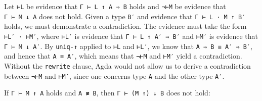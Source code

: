 Let \texttt{⊢L} be evidence that \texttt{Γ\ ⊢\ L\ ↑\ A\ ⇒\ B} holds and
\texttt{¬⊢M} be evidence that \texttt{Γ\ ⊢\ M\ ↓\ A} does not hold.
Given a type \texttt{B′} and evidence that \texttt{Γ\ ⊢\ L\ ·\ M\ ↑\ B′}
holds, we must demonstrate a contradiction. The evidence must take the
form \texttt{⊢L′\ ·\ ⊢M′}, where \texttt{⊢L′} is evidence that
\texttt{Γ\ ⊢\ L\ ↑\ A′\ ⇒\ B′} and \texttt{⊢M′} is evidence that
\texttt{Γ\ ⊢\ M\ ↓\ A′}. By \texttt{uniq-↑} applied to \texttt{⊢L} and
\texttt{⊢L′}, we know that \texttt{A\ ⇒\ B\ ≡\ A′\ ⇒\ B′}, and hence
that \texttt{A\ ≡\ A′}, which means that \texttt{¬⊢M} and \texttt{⊢M′}
yield a contradiction. Without the \texttt{rewrite} clause, Agda would
not allow us to derive a contradiction between \texttt{¬⊢M} and
\texttt{⊢M′}, since one concerns type \texttt{A} and the other type
\texttt{A′}.

If \texttt{Γ\ ⊢\ M\ ↑\ A} holds and \texttt{A\ ≢\ B}, then
\texttt{Γ\ ⊢\ (M\ ↑)\ ↓\ B} does not hold:

\begin{fence}
\begin{code}%
\>[0]\AgdaSpace{}%
\AgdaSymbol{:}\AgdaSpace{}%
\AgdaSpace{}%
\AgdaSymbol{\{}\AgdaSpace{}%
\AgdaSpace{}%
\AgdaSpace{}%
\AgdaSymbol{\}}\<%
\\
\>[0][@{}l@{\AgdaIndent{0}}]%
\>[2]\AgdaSpace{}%
\AgdaSpace{}%
\AgdaSpace{}%
\AgdaSpace{}%
\AgdaSpace{}%
\<%
\\
%
\>[2]%
\>[895I]\AgdaSpace{}%
\AgdaSpace{}%
\<%
\\
\>[.][@{}l@{}]\<[895I]%
\>[4]\AgdaComment{---------------}\<%
\\
%
\>[2]\AgdaSpace{}%
\AgdaSpace{}%
\AgdaSpace{}%
\AgdaSpace{}%
\AgdaSymbol{(}\AgdaSpace{}%
\AgdaSymbol{)}\AgdaSpace{}%
\AgdaSpace{}%
\<%
\\
\>[0]\AgdaSpace{}%
\AgdaSpace{}%
\AgdaSpace{}%
\AgdaSymbol{(}\AgdaSpace{}%
\AgdaSpace{}%
\AgdaSymbol{)}\AgdaSpace{}%
\AgdaSpace{}%
\AgdaSpace{}%
\AgdaSpace{}%
\AgdaSpace{}%
\AgdaSymbol{=}\AgdaSpace{}%
\AgdaSpace{}%
\<%
\end{code}
\end{fence}

